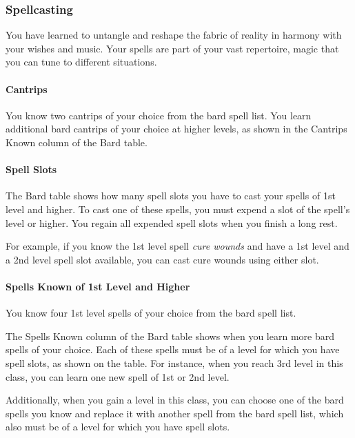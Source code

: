 \documentclass[
]{article}
\begin{document}
\hypertarget{spellcasting}{%
\subsubsection{Spellcasting}\label{spellcasting}}

You have learned to untangle and reshape the fabric of reality in
harmony with your wishes and music. Your spells are part of your vast
repertoire, magic that you can tune to different situations.

\hypertarget{cantrips}{%
\paragraph{Cantrips}\label{cantrips}}

You know two cantrips of your choice from the bard spell list. You learn
additional bard cantrips of your choice at higher levels, as shown in
the Cantrips Known column of the Bard table.

\hypertarget{spell-slots}{%
\paragraph{Spell Slots}\label{spell-slots}}

The Bard table shows how many spell slots you have to cast your spells
of 1st level and higher. To cast one of these spells, you must expend a
slot of the spell's level or higher. You regain all expended spell slots
when you finish a long rest.

For example, if you know the 1st level spell \emph{cure wounds} and have
a 1st level and a 2nd level spell slot available, you can cast cure
wounds using either slot.

\hypertarget{spells-known-of-1st-level-and-higher}{%
\paragraph{Spells Known of 1st Level and
Higher}\label{spells-known-of-1st-level-and-higher}}

You know four 1st level spells of your choice from the bard spell list.

The Spells Known column of the Bard table shows when you learn more bard
spells of your choice. Each of these spells must be of a level for which
you have spell slots, as shown on the table. For instance, when you
reach 3rd level in this class, you can learn one new spell of 1st or 2nd
level.

Additionally, when you gain a level in this class, you can choose one of
the bard spells you know and replace it with another spell from the bard
spell list, which also must be of a level for which you have spell
slots.
\end{document}

